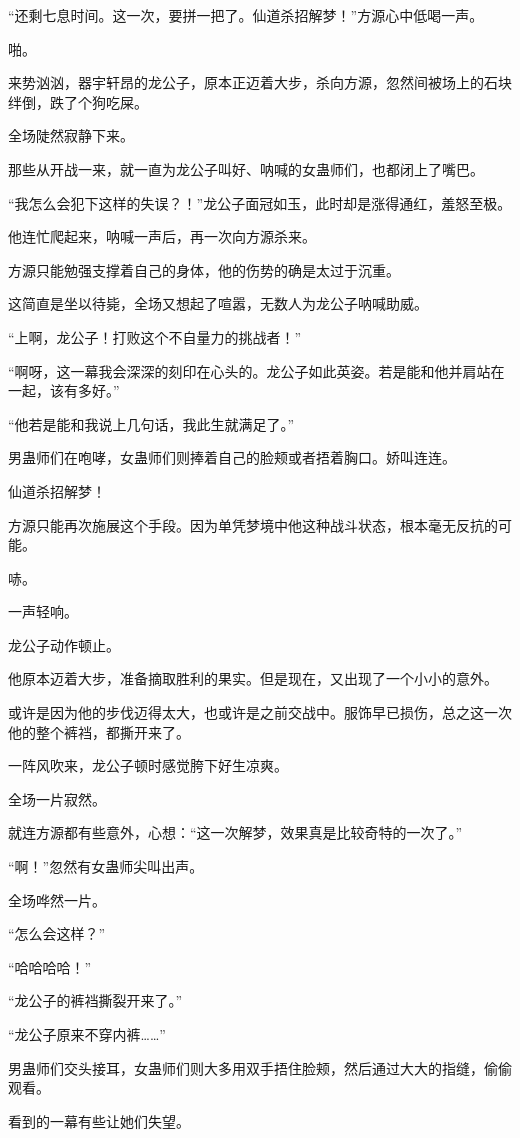 \begin{this_body}
“还剩七息时间。这一次，要拼一把了。仙道杀招解梦！”方源心中低喝一声。

啪。

来势汹汹，器宇轩昂的龙公子，原本正迈着大步，杀向方源，忽然间被场上的石块绊倒，跌了个狗吃屎。

全场陡然寂静下来。

那些从开战一来，就一直为龙公子叫好、呐喊的女蛊师们，也都闭上了嘴巴。

“我怎么会犯下这样的失误？！”龙公子面冠如玉，此时却是涨得通红，羞怒至极。

他连忙爬起来，呐喊一声后，再一次向方源杀来。

方源只能勉强支撑着自己的身体，他的伤势的确是太过于沉重。

这简直是坐以待毙，全场又想起了喧嚣，无数人为龙公子呐喊助威。

“上啊，龙公子！打败这个不自量力的挑战者！”

“啊呀，这一幕我会深深的刻印在心头的。龙公子如此英姿。若是能和他并肩站在一起，该有多好。”

“他若是能和我说上几句话，我此生就满足了。”

男蛊师们在咆哮，女蛊师们则捧着自己的脸颊或者捂着胸口。娇叫连连。

仙道杀招解梦！

方源只能再次施展这个手段。因为单凭梦境中他这种战斗状态，根本毫无反抗的可能。

哧。

一声轻响。

龙公子动作顿止。

他原本迈着大步，准备摘取胜利的果实。但是现在，又出现了一个小小的意外。

或许是因为他的步伐迈得太大，也或许是之前交战中。服饰早已损伤，总之这一次他的整个裤裆，都撕开来了。

一阵风吹来，龙公子顿时感觉胯下好生凉爽。

全场一片寂然。

就连方源都有些意外，心想：“这一次解梦，效果真是比较奇特的一次了。”

“啊！”忽然有女蛊师尖叫出声。

全场哗然一片。

“怎么会这样？”

“哈哈哈哈！”

“龙公子的裤裆撕裂开来了。”

“龙公子原来不穿内裤……”

男蛊师们交头接耳，女蛊师们则大多用双手捂住脸颊，然后通过大大的指缝，偷偷观看。

看到的一幕有些让她们失望。


\end{this_body}
